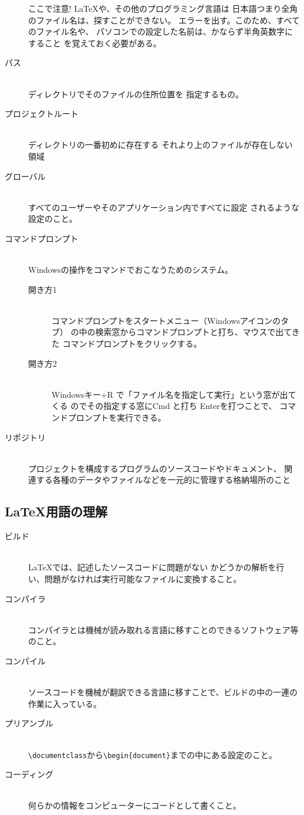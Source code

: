 \documentclass{ltjsarticle}
\begin{document}
\begin{description}
    ここで注意! \LaTeX や、その他のプログラミング言語は
    日本語つまり全角のファイル名は、探すことができない。
    エラーを出す。このため、すべてのファイル名や、
    パソコンでの設定した名前は、かならず半角英数字にすること
    を覚えておく必要がある。
  \item [パス] ~\\
    ディレクトリでそのファイルの住所位置を
    指定するもの。
  \item [プロジェクトルート] ~\\
    ディレクトリの一番初めに存在する
    それより上のファイルが存在しない領域
  \item [グローバル] ~\\
    すべてのユーザーやそのアプリケーション内ですべてに設定
    されるような設定のこと。
  \item [コマンドプロンプト] ~\\
    Windowsの操作をコマンドでおこなうためのシステム。
    \begin{description}
      \item[開き方1] ~\\
       コマンドプロンプトをスタートメニュー（Windowsアイコンのタブ）
      の中の検索窓からコマンドプロンプトと打ち、マウスで出てきた
      コマンドプロンプトをクリックする。
      \item[開き方2] ~\\
      Windowsキー+R で「ファイル名を指定して実行」という窓が出てくる
      のでその指定する窓にCmd と打ち Enterを打つことで、
      コマンドプロンプトを実行できる。
    \end{description}
  \item [リポジトリ] ~\\
    プロジェクトを構成するプログラムのソースコードやドキュメント、
    関連する各種のデータやファイルなどを一元的に管理する格納場所のこと

\end{description}

\subsection{\LaTeX 用語の理解}
\begin{description}
  \item [ビルド] ~\\
    \LaTeX では、記述したソースコードに問題がない
    かどうかの解析を行い、問題がなければ実行可能なファイルに変換すること。
  \item [コンパイラ] ~\\
    コンパイラとは機械が読み取れる言語に移すことのできるソフトウェア等のこと。
  \item [コンパイル] ~\\
    ソースコードを機械が翻訳できる言語に移すことで、ビルドの中の一連の作業に入っている。
  \item [プリアンブル] ~\\
    \verb|\documentclass|から\verb|\begin{document}|までの中にある設定のこと。
  \item [コーディング] ~\\
    何らかの情報をコンピューターにコードとして書くこと。
\end{description}
\end{document}
